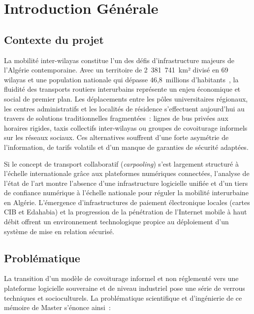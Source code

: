 \chapter*{Introduction Générale}

\section*{Contexte du projet}

La mobilité inter-wilayas constitue l'un des défis d'infrastructure majeurs de l'Algérie contemporaine. Avec un territoire de 2~381~741~km² divisé en 69 wilayas et une population nationale qui dépasse 46,8~millions d'habitants~\cite{ons_2024}, la fluidité des transports routiers interurbains représente un enjeu économique et social de premier plan. Les déplacements entre les pôles universitaires régionaux, les centres administratifs et les localités de résidence s'effectuent aujourd'hui au travers de solutions traditionnelles fragmentées~: lignes de bus privées aux horaires rigides, taxis collectifs inter-wilayas ou groupes de covoiturage informels sur les réseaux sociaux. Ces alternatives souffrent d'une forte asymétrie de l'information, de tarifs volatils et d'un manque de garanties de sécurité adaptées.

Si le concept de transport collaboratif (\textit{carpooling}) s'est largement structuré à l'échelle internationale grâce aux plateformes numériques connectées, l'analyse de l'état de l'art montre l'absence d'une infrastructure logicielle unifiée et d'un tiers de confiance numérique à l'échelle nationale pour réguler la mobilité interurbaine en Algérie. L'émergence d'infrastructures de paiement électronique locales (cartes CIB et Edahabia) et la progression de la pénétration de l'Internet mobile à haut débit offrent un environnement technologique propice au déploiement d'un système de mise en relation sécurisé.

\section*{Problématique}

La transition d'un modèle de covoiturage informel et non réglementé vers une plateforme logicielle souveraine et de niveau industriel pose une série de verrous techniques et socioculturels. La problématique scientifique et d'ingénierie de ce mémoire de Master s'énonce ainsi~:

